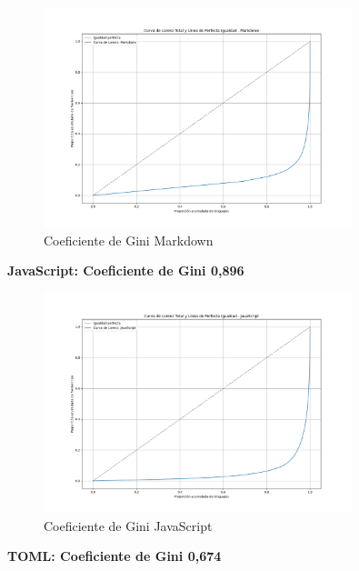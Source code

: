 \documentclass[a4paper, 12pt]{book}
\begin{document}
\begin{itemize}
\begin{itemize}
          \begin{figure}[H]
            \centering
            \includegraphics[width=0.8\textwidth]{img/curva_lorenz_total_Markdown.png}
            \caption{Coeficiente de Gini Markdown}
            \label{figura:ginigraficaMarkdown}
          \end{figure}

          \textbf{JavaScript: Coeficiente de Gini 0,896}
          
          \begin{figure}[H]
            \centering
            \includegraphics[width=0.8\textwidth]{img/curva_lorenz_total_JavaScript.png}
            \caption{Coeficiente de Gini JavaScript}
            \label{figura:ginigraficaJavaScript}
          \end{figure}

          \textbf{TOML: Coeficiente de Gini 0,674}


\end{itemize}
\end{itemize}
\end{document}
